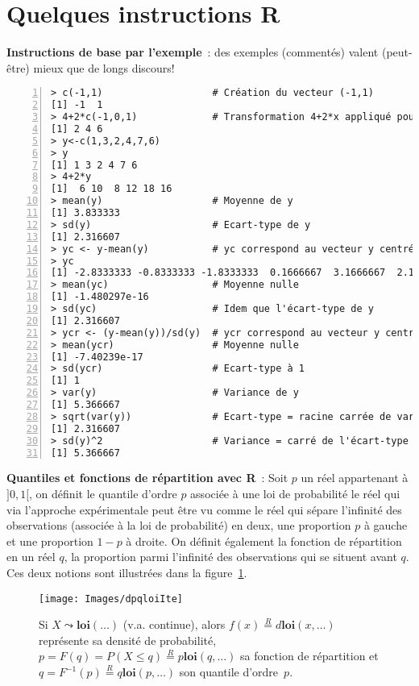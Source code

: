 \documentclass[10pt]{article}
\begin{document}
\section{Quelques instructions R}
\noindent\textbf{Instructions de base par l'exemple}~: des exemples (commentés) valent (peut-être) mieux que de longs discours!
\begin{Verbatim}[frame=leftline,fontfamily=tt,fontshape=n,numbers=left]
> c(-1,1)                   # Création du vecteur (-1,1)
[1] -1  1
> 4+2*c(-1,0,1)             # Transformation 4+2*x appliqué pour chaque composante de y
[1] 2 4 6
> y<-c(1,3,2,4,7,6)
> y
[1] 1 3 2 4 7 6
> 4+2*y
[1]  6 10  8 12 18 16
> mean(y)                   # Moyenne de y
[1] 3.833333
> sd(y)                     # Ecart-type de y
[1] 2.316607
> yc <- y-mean(y)           # yc correspond au vecteur y centré
> yc
[1] -2.8333333 -0.8333333 -1.8333333  0.1666667  3.1666667  2.1666667
> mean(yc)                  # Moyenne nulle
[1] -1.480297e-16
> sd(yc)                    # Idem que l'écart-type de y
[1] 2.316607
> ycr <- (y-mean(y))/sd(y)  # ycr correspond au vecteur y centré et réduit
> mean(ycr)                 # Moyenne nulle
[1] -7.40239e-17
> sd(ycr)                   # Ecart-type à 1
[1] 1
> var(y)                    # Variance de y
[1] 5.366667
> sqrt(var(y))              # Ecart-type = racine carrée de variance
[1] 2.316607
> sd(y)^2                   # Variance = carré de l'écart-type
[1] 5.366667
\end{Verbatim}

\noindent\textbf{Quantiles et fonctions de répartition avec R}~:
Soit $p$ un r{\'e}el appartenant {\`a} $]0,1[$, on d{\'e}finit le quantile d'ordre $p$ associ{\'e}e {\`a} une loi de probabilit{\'e} le r{\'e}el qui via l'approche exp{\'e}rimentale peut {\^e}tre vu comme le r{\'e}el qui s{\'e}pare l'infinit{\'e} des observations (associ{\'e}e {\`a} la loi de probabilit{\'e}) en deux, une proportion $p$ {\`a} gauche et une proportion $1-p$ {\`a} droite. On d{\'e}finit {\'e}galement la fonction de r{\'e}partition en un r{\'e}el $q$, la proportion parmi l'infinit{\'e} des observations qui se situent avant $q$. Ces deux notions sont illustr{\'e}es dans la figure~\ref{fig:rloi}. \\


\begin{figure}[htbp]
\centerline{\texttt{[image: Images/dpqloiIte]}}
\caption{Si $X\leadsto\mathbf{loi}(\ldots)$ (v.a. continue), alors $f\left(x\right)\stackrel{R}{=}d\mathbf{loi}\left(x,\ldots\right)$ repr{\'e}sente sa densit{\'e} de probabilit{\'e}, $p=F(q)=P(X\leq q)\stackrel{R}{=}p\mathbf{loi}\left(q,\ldots\right)$ sa fonction de r{\'e}partition et $q=F^{-1}(p)\stackrel{R}{=}q\mathbf{loi}\left(p,\ldots\right)$ son quantile d'ordre~$p$.}
\label{fig:rloi}
\end{figure}
\end{document}
